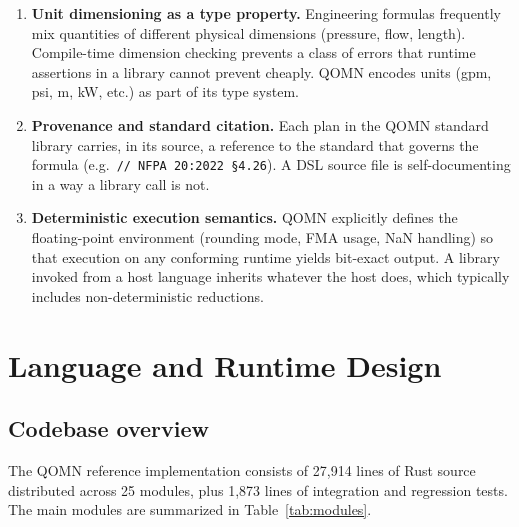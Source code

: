 \documentclass[11pt,a4paper]{article}
\begin{document}
\begin{enumerate}[leftmargin=*]
\item \textbf{Unit dimensioning as a type property.} Engineering formulas frequently mix quantities of different physical dimensions (pressure, flow, length). Compile-time dimension checking prevents a class of errors that runtime assertions in a library cannot prevent cheaply. QOMN encodes units (gpm, psi, m, kW, etc.) as part of its type system.
\item \textbf{Provenance and standard citation.} Each plan in the QOMN standard library carries, in its source, a reference to the standard that governs the formula (e.g.\ \texttt{// NFPA~20:2022 \S{}4.26}). A DSL source file is self-documenting in a way a library call is not.
\item \textbf{Deterministic execution semantics.} QOMN explicitly defines the floating-point environment (rounding mode, FMA usage, NaN handling) so that execution on any conforming runtime yields bit-exact output. A library invoked from a host language inherits whatever the host does, which typically includes non-deterministic reductions.
\end{enumerate}

\section{Language and Runtime Design}
\label{sec:design}

\subsection{Codebase overview}

The QOMN reference implementation consists of 27{,}914 lines of Rust source distributed across 25 modules, plus 1{,}873 lines of integration and regression tests. The main modules are summarized in Table~\ref{tab:modules}.
\end{document}

